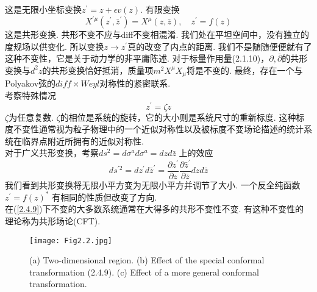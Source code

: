 这是无限小坐标变换$z^{\prime}=z+\epsilon v(z)$. 
有限变换
\begin{equation}
X^{\prime \mu}\left(z^{\prime}, \bar{z}^{\prime}\right)=X^{\mu}(z, \bar{z}), \quad z^{\prime}=f(z)
\end{equation}
这是共形变换.
共形不变不应与diff不变相混淆. 我们处在平坦空间中，没有独立的度规场以供变化. 所以变换$z\to z^\prime$真的改变了内点的距离. 我们不是随随便便就有了这种不变性，它是关于动力学的非平庸陈述. 对于标量作用量(2.1.10)，$\partial,\bar{\partial}$的共形变换与$d^2 z$的共形变换恰好抵消，质量项$m^{2} X^{\mu} X_{\mu}$将是不变的.
最终，存在一个与Polyakov弦的$diff\times Weyl$对称性的紧密联系. \\
考察特殊情况
\begin{equation}\label{2.4.9}
z^{\prime}=\zeta z
\end{equation}
$\zeta$为任意复数. $\zeta$的相位是系统的旋转，它的大小则是系统尺寸的重新标度. 这种标度不变性通常视为粒子物理中的一个近似对称性以及被标度不变场论描述的统计系统在临界点附近所拥有的近似对称性. \\
对于广义共形变换，考察$d s^{2}=d \sigma^{a} d \sigma^{a}=d z d \bar{z}$ 上的效应
\begin{equation}
d s^{\prime 2}=d z^{\prime} d \bar{z}^{\prime}=\frac{\partial z^{\prime}}{\partial z} \frac{\partial \bar{z}^{\prime}}{\partial \bar{z}} d z d \bar{z}
\end{equation}
我们看到共形变换将无限小平方变为无限小平方并调节了大小. 一个反全纯函数$z^{\prime}=f(z)^{*}$ 有相同的性质但改变了方向. \\
在(\ref{2.4.9})下不变的大多数系统通常在大得多的共形不变性不变. 有这种不变性的理论称为共形场论(CFT). \\
\begin{figure}
	\begin{center}
		\texttt{[image: Fig2.2.jpg]}\\
\caption{(a) Two-dimensional region. (b) Effect of the special conformal transformation (2.4.9). (c) Effect of a more general conformal transformation.}
	\end{center}
\end{figure}

